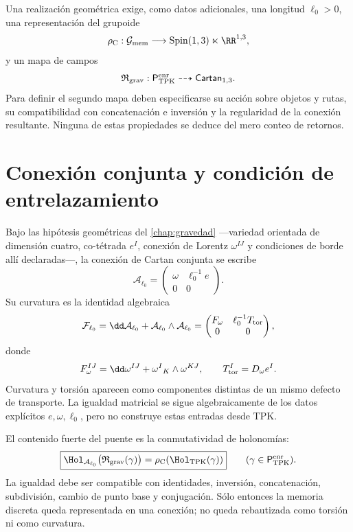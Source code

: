 Una realización geométrica exige, como datos adicionales, una longitud
\(\ell_0>0\), una representación del grupoide
\[
 \rho_{\rm C}:
 \mathcal G_{\rm mem}
 \longrightarrow
 \operatorname{Spin}(1,3)\ltimes\RR^{1,3},
\]
y un mapa de campos
\[
 \mathfrak R_{\rm grav}:
 \mathsf P_{\rm TPK}^{\rm enr}
 \dashrightarrow
 \mathsf{Cartan}_{1,3}.
\]
Para definir el segundo mapa deben especificarse su acción sobre objetos y
rutas, su compatibilidad con concatenación e inversión y la regularidad de la
conexión resultante. Ninguna de estas propiedades se deduce del mero conteo
de retornos.

\section{Conexión conjunta y condición de entrelazamiento}
\label{sec:conexion-cartan-conjunta}

Bajo las hipótesis geométricas del \cref{chap:gravedad} ---variedad
orientada de dimensión cuatro, co-tétrada \(e^I\), conexión de Lorentz
\(\omega^{IJ}\) y condiciones de borde allí declaradas---, la conexión de
Cartan conjunta se escribe
\[
 \mathcal A_{\ell_0}
 =
 \begin{pmatrix}
  \omega&\ell_0^{-1}e\\
  0&0
 \end{pmatrix}.
\]
Su curvatura es la identidad algebraica
\[
 \mathcal F_{\ell_0}
 =\dd\mathcal A_{\ell_0}
  +\mathcal A_{\ell_0}\wedge\mathcal A_{\ell_0}
 =
 \begin{pmatrix}
  F_\omega&\ell_0^{-1}T_{\rm tor}\\
  0&0
 \end{pmatrix},
\]
donde
\[
 F_\omega^{IJ}
 =\dd\omega^{IJ}+\omega^I{}_K\wedge\omega^{KJ},
 \qquad
 T_{\rm tor}^{I}=D_\omega e^I.
\]
Curvatura y torsión aparecen como componentes distintas de un mismo defecto
de transporte. La igualdad matricial se sigue algebraicamente de los datos
explícitos \(e,\omega,\ell_0\), pero no construye estas entradas desde TPK.

El contenido fuerte del puente es la conmutatividad de holonomías:
\[
 \boxed{
 \Hol_{\mathcal A_{\ell_0}}
 \bigl(\mathfrak R_{\rm grav}(\gamma)\bigr)
 =
 \rho_{\rm C}\!\left(
 \Hol_{\rm TPK}(\gamma)
 \right)}
 \qquad
 (\gamma\in\mathsf P_{\rm TPK}^{\rm enr}).
\]
La igualdad debe ser compatible con identidades, inversión, concatenación,
subdivisión, cambio de punto base y conjugación. Sólo entonces la memoria
discreta queda representada en una conexión; no queda rebautizada como
torsión ni como curvatura.

